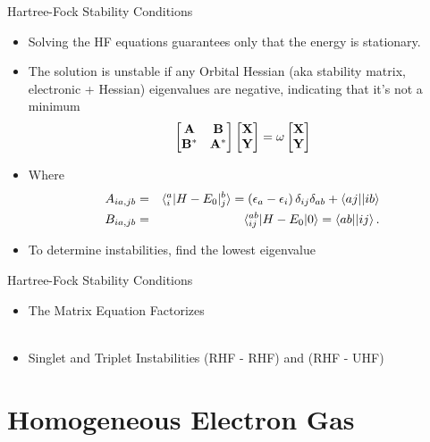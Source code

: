 \documentclass[10pt]{beamer}
\begin{document}
{{{{\begin{frame}{Hartree-Fock Stability Conditions}
	\begin{itemize}[<+->]
		\item Solving the HF equations guarantees only that the energy is \alert{stationary}.
		\item{The solution is \alert{unstable} if any \alert{Orbital Hessian} (aka stability matrix, 
		electronic +
		Hessian) eigenvalues are \alert{negative}, indicating that it's not a minimum
			\begin{eqnarray}
				\begin{bmatrix}
					\bf{A}   & \bf{B}   \\
					\bf{B}^* & \bf{A}^* \\
				\end{bmatrix}
				\begin{bmatrix}  \bf{X} \\ \bf{Y}  \end{bmatrix}
				= \omega \begin{bmatrix}  \bf{X} \\ \bf{Y}  \end{bmatrix}
			\end{eqnarray}
		}
		\item{Where}
		\begin{eqnarray}
			A_{ia,jb} &=& \braket{{}_i^a|H-E_0|{}_j^b} = \left(\epsilon_a - \epsilon_i \right) \delta_{ij}\delta_{ab} + \braket{aj||ib}
			\nonumber \\
			B_{ia,jb} &=& \braket{{}_{ij}^{ab}|H-E_0|0} = \braket{ab||ij}.
		\end{eqnarray}
		\item{To determine instabilities, find the lowest eigenvalue}
	\end{itemize}
\end{frame}


{%
\begin{frame}{Hartree-Fock Stability Conditions}
	\begin{itemize}
		\item[]{The Matrix Equation Factorizes} \\~\\
		\item[]{Singlet and Triplet Instabilities (RHF - RHF) and (RHF - UHF) }
	\end{itemize}
\end{frame}

\section{Homogeneous Electron Gas}

}}}}}
\end{document}
